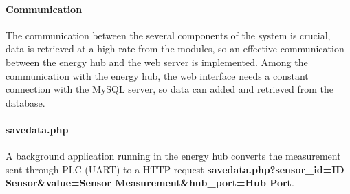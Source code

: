 \paragraph{Communication}
The communication between the several components of the system is crucial, data is retrieved at a high rate from the modules, so an effective communication between the energy hub and the web server is implemented. Among the communication with the energy hub, the web interface needs a constant connection with the MySQL server, so data can added and retrieved from the database.

\paragraph{savedata.php}
A background application running in the energy hub converts the measurement sent through PLC (UART) to a HTTP request \textbf{savedata.php?sensor\_id=ID Sensor\&value=Sensor Measurement\&hub\_port=Hub Port}.

